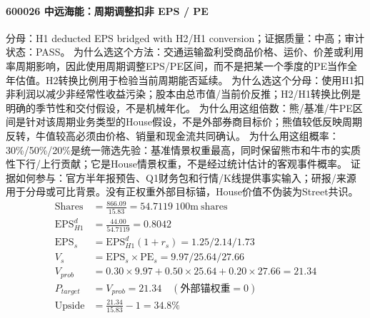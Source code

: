 \paragraph{600026 中远海能：周期调整扣非 EPS / PE}
分母：H1 deducted EPS bridged with H2/H1 conversion；证据质量：中高；审计状态：PASS。
为什么选这个方法：交通运输盈利受商品价格、运价、价差或利用率周期影响，因此使用周期调整EPS/PE区间，而不是把某一个季度的PE当作全年估值。H2转换比例用于检验当前周期能否延续。
为什么选这个分母：使用H1扣非利润以减少非经常性收益污染；股本由总市值/当前价反推；H2/H1转换比例是明确的季节性和交付假设，不是机械年化。
为什么用这组倍数：熊/基准/牛PE区间是针对该周期业务类型的House假设，不是外部券商目标价；熊值较低反映周期反转，牛值较高必须由价格、销量和现金流共同确认。
为什么用这组概率：30\%/50\%/20\%是统一筛选先验：基准情景权重最高，同时保留熊市和牛市的实质性下行/上行贡献；它是House情景权重，不是经过统计估计的客观事件概率。
证据如何参与：官方半年报预告、Q1财务包和行情/K线提供事实输入；研报/来源用于分母或可比背景。没有正权重外部目标锚，House价值不伪装为Street共识。
\begin{align*}
\mathrm{Shares} &= \frac{866.09}{15.83}=54.7119\ \mathrm{100m\ shares}\\
\mathrm{EPS}_{H1}^d &= \frac{44.00}{54.7119}=0.8042\\
\mathrm{EPS}_s &= \mathrm{EPS}_{H1}^d(1+r_s)=1.25/2.14/1.73\\
V_s &= \mathrm{EPS}_s\times \mathrm{PE}_s=9.97/25.64/27.66\\
V_{prob} &= 0.30\times 9.97+0.50\times 25.64+0.20\times 27.66=21.34\\
P_{target} &= V_{prob}=21.34\quad(\text{外部锚权重}=0)\\
\mathrm{Upside} &= \frac{21.34}{15.83}-1=34.8\%\\
\end{align*}

